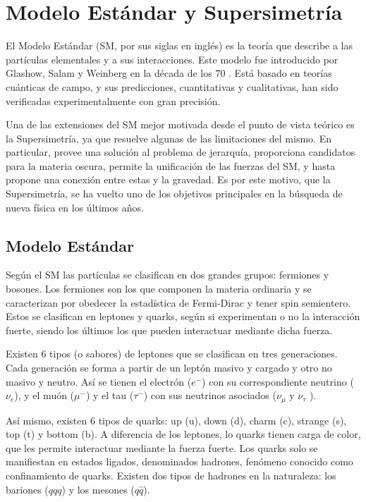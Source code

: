 \chapter{Modelo Estándar y Supersimetría}


El Modelo Estándar (SM, por sus siglas en inglés) es la teoría que describe a las partículas elementales y a sus interacciones. Este modelo fue introducido por Glashow, Salam y Weinberg en la década de los 70 \cite{Glashow:1961tr,PhysRevLett.19.1264}. Está basado en teorías cuánticas de campo, y sus predicciones, cuantitativas y cualitativas, han sido verificadas experimentalmente con gran precisión.

Una de las extensiones del SM mejor motivada desde el punto de vista teórico es la Supersimetría, ya que resuelve algunas de las limitaciones del mismo. En particular, provee una solución al problema de jerarquía, proporciona candidatos para la materia oscura, permite la unificación de las fuerzas del SM, y hasta propone una conexión entre estas y la gravedad. Es por este motivo, que la Supersimetría, se ha vuelto uno de los objetivos principales en la búsqueda de nueva física en los últimos años.

\section{Modelo Estándar}
 
Según el SM las partículas se clasifican en dos grandes grupos: fermiones y bosones. Los fermiones son los que componen la materia ordinaria y se caracterizan por obedecer la estadística de Fermi-Dirac y tener spin semientero. Estos se clasifican en leptones y quarks, según si experimentan o no la interacción fuerte, siendo los últimos los que pueden interactuar mediante dicha fuerza.  

Existen 6 tipos (o sabores) de leptones que se clasifican en tres generaciones. Cada generación se forma a partir de un leptón masivo y cargado y otro no masivo y neutro. Así se tienen el electrón ($e^{-}$) con su correspondiente neutrino ($\nu_{e}$), y el muón ($\mu^{-}$) y el tau ($\tau^{-}$) con sus neutrinos asociados ($\nu_{\mu}$ y $\nu_{\tau}$ ).


Así mismo, existen 6 tipos de quarks: up (u), down (d), charm (c), strange (s), top (t) y bottom (b). A diferencia de los leptones, lo quarks tienen carga de color, que les permite interactuar mediante la fuerza fuerte. Los quarks solo se manifiestan en estados ligados, denominados hadrones, fenómeno conocido
como confinamiento de quarks. Existen dos tipos de hadrones en la naturaleza: los bariones ($qqq$) y los mesones ($q\hat{q}$).

